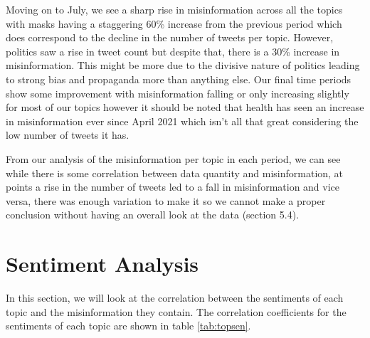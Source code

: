 \documentclass{l4proj}
\begin{document}
Moving on to July, we see a sharp rise in misinformation across all the topics with masks having a staggering 60\% increase from the previous period which does correspond to the decline in the number of tweets per topic. However, politics saw a rise in tweet count but despite that, there is a 30\% increase in misinformation. This might be more due to the divisive nature of politics leading to strong bias and propaganda more than anything else. Our final time periods show some improvement with misinformation falling or only increasing slightly for most of our topics however it should be noted that health has seen an increase in misinformation ever since April 2021 which isn't all that great considering the low number of tweets it has.

From our analysis of the misinformation per topic in each period, we can see while there is some correlation between data quantity and misinformation, at points a rise in the number of tweets led to a fall in misinformation and vice versa, there was enough variation to make it so we cannot make a proper conclusion without having an overall look at the data (section 5.4).

\section{Sentiment Analysis}

In this section, we will look at the correlation between the sentiments of each topic and the misinformation they contain. The correlation coefficients for the sentiments of each topic are shown in table \ref{tab:topsen}.
\end{document}
